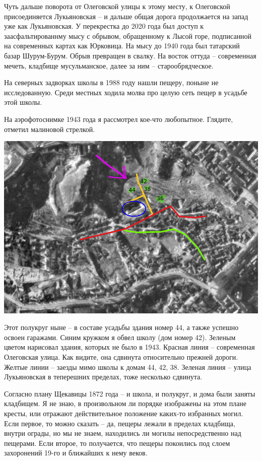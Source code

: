 Чуть дальше поворота от Олеговской улицы к этому месту, к Олеговской присоединяется Лукьяновская – и дальше общая дорога продолжается на запад уже как Лукьяновская. У перекрестка до 2020 года был доступ к заасфальтированнму мысу с обрывом, обращенному к Лысой горе, подписанной на современных картах как Юрковица. На мысу до 1940 года был татарский базар Шурум-Бурум. Обрыв превращен в свалку. На восток оттуда – современная мечеть, кладбище мусульманское, далее за ним – старообрядческое.

На северных задворках школы в 1988 году нашли пещеру, поныне не исследованную. Среди местных ходила молва про целую сеть пещер в усадьбе этой школы.

На аэрофотоснимке 1943 года я рассмотрел кое-что любопытное. Глядите, отметил малиновой стрелкой.

\begin{center}
\includegraphics[width=\linewidth]{chast-colebanie-osnov/sheka/she.jpg}
\end{center}

Этот полукруг ныне – в составе усадьбы здания номер 44, а также успешно освоен гаражами. Синим кружком я обвел школу (дом номер 42). Зеленым цветом нарисовал здания, которых не было в 1943. Красная линия – современная Олеговская улица. Как видите, она сдвинута относительно прежней дороги. Желтые линии – заезды мимо школы к домам 44, 42, 38. Зеленая линия – улица Лукьяновская в теперешних пределах, тоже несколько сдвинута.

Согласно плану Щекавицы 1872 года – и школа, и полукруг, и дома были заняты кладбищем. Я не знаю, в произвольном ли порядке изображены на этом плане кресты, или отражают действительное положение каких-то избранных могил. Если первое, то можно сказать – да, пещеры лежали в пределах кладбища, внутри ограды, но мы не знаем, находились ли могилы непосредственно над пещерами. Если второе, то получается, что пещеры покоились под слоем захоронений 19-го и ближайших к нему веков. 

